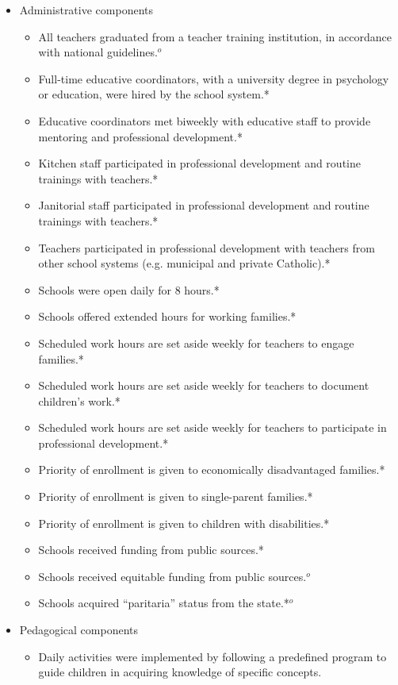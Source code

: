 \begin{itemize}
 \item Administrative components
 \begin{itemize}
 	\item All teachers graduated from a teacher training institution, in accordance with national guidelines.$^o$
 	\item Full-time educative coordinators, with a university degree in psychology or education, were hired by the school system.*
 	\item Educative coordinators met biweekly with educative staff to provide mentoring and professional development.*
 	\item Kitchen staff participated in professional development and routine trainings with teachers.*
 	\item Janitorial staff participated in professional development and routine trainings with teachers.*
 	\item Teachers participated in professional development with teachers from other school systems (e.g. municipal and private Catholic).*
 	\item Schools were open daily for 8 hours.*
 	\item Schools offered extended hours for working families.*
 	\item Scheduled work hours are set aside weekly for teachers to engage families.*
 	\item Scheduled work hours are set aside weekly for teachers to document children's work.*
 	\item Scheduled work hours are set aside weekly for teachers to participate in professional development.*
 	\item Priority of enrollment is given to economically disadvantaged families.*
 	\item Priority of enrollment is given to single-parent families.*
 	\item Priority of enrollment is given to children with disabilities.*
 	\item Schools received funding from public sources.*
	\item Schools received equitable funding from public sources.$^o$
	\item Schools acquired ``paritaria'' status from the state.*$^o$
 \end{itemize}
 \item Pedagogical components
 \begin{itemize}
 	\item Daily activities were implemented by following a predefined program to guide children in acquiring knowledge of specific concepts.

\end{itemize}
\end{itemize}

